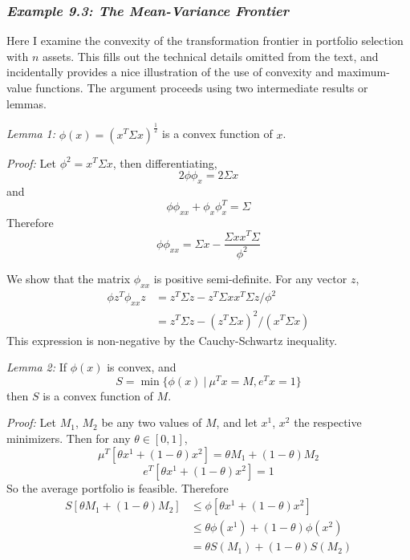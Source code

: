 \subsubsection*{\textit{Example 9.3: The Mean-Variance Frontier}}

Here I examine the convexity of the transformation frontier in portfolio selection with $n$ assets. This fills out the technical details omitted from the text, and incidentally provides a nice illustration of the use of convexity and maximum-value functions. The argument proceeds using two intermediate results or lemmas.

\textit{Lemma 1:} $\phi(x) = (x^T \Sigma x)^{\frac{1}{2}}$ is a convex function of $x$.

\textit{Proof:} Let $\phi^2 = x^T \Sigma x$, then differentiating,
\begin{equation*}
 2 \phi \phi_x = 2 \Sigma x
\end{equation*}
and
\begin{equation*}
  \phi \phi_{xx} + \phi_x \phi_x^T =  \Sigma 
\end{equation*}
Therefore
\begin{equation*}
 \phi \phi_{xx} =  \Sigma x - \dfrac{\Sigma x x^T \Sigma}{\phi^2}
\end{equation*}

We show that the matrix $\phi_{xx}$ is positive semi-definite. For any vector $z$,
\begin{equation*}
\begin{array}{rl}
 \phi z^T \phi_{xx} z &= z^T \Sigma z - z^T \Sigma x x^T \Sigma z / \phi^2 \\
                      &= z^T \Sigma z - (z^T \Sigma x)^2 /(x^T \Sigma x)
\end{array}
\end{equation*}
This expression is non-negative by the Cauchy-Schwartz inequality.

\textit{Lemma 2:} If $\phi(x)$ is convex, and
\begin{equation*}
S = \min \{ \phi(x) \ | \ \mu^T x = M, e^T x =1   \}
\end{equation*}
then $S$ is a convex function of $M$.

\textit{Proof:} Let $M_1$, $M_2$ be any two values of $M$, and let $x^1$, $x^2$ the respective minimizers. Then for any $\theta \in [0,1]$,
\begin{equation*}
\mu^T [\theta x^1 + (1-\theta)x^2] = \theta M_1 + (1-\theta) M_2
\end{equation*}
\begin{equation*}
e^T  [\theta x^1 + (1-\theta)x^2] = 1
\end{equation*}
So the average portfolio is feasible. Therefore
\begin{equation*}
\begin{array}{rl}
 S[\theta M_1 + (1-\theta)M_2] &\leq \phi [\theta x^1 + (1-\theta)x^2] \\
                      &\leq  \theta \phi(x^1) + (1-\theta)\phi(x^2) \\
                       &= \theta S(M_1) + (1-\theta)S(M_2)
\end{array}
\end{equation*}

